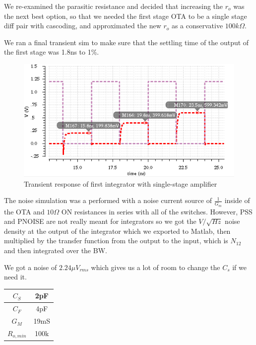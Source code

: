 \documentclass[conference]{IEEEtran}
\begin{document}
We re-examined the parasitic resistance and decided that increasing the $r_o$ was the next best option, so that we needed the first stage OTA to be a single stage diff pair with cascoding, and approximated the new $r_o$ as a conservative $100k\Omega$.

We ran a final transient sim to make sure that the settling time of the output of the first stage was 1.8ns to 1\%. 

\begin{figure}[h]
\centering
\includegraphics[width=\linewidth]{img/stage1-tran}
\caption{Transient response of first integrator with single-stage amplifier}
\label{stage1-tran}
\end{figure}

The noise simulation was a performed with a noise current source of $\frac{1}{G_m}$ inside of the OTA and $10\Omega$ ON resistances in series with all of the switches. However, PSS and PNOISE are not really meant for integrators so we got the $V/\sqrt{Hz}$ noise density at the output of the integrator which we exported to Matlab, then multiplied by the transfer function from the output to the input, which is $N_{12}$ and then integrated over the BW.

We got a noise of $2.24\mu V_{rms}$ which gives us a lot of room to change the $C_s$ if we need it.

\begin{center}
\begin{tabular}{|c|c|} 
\hline
$C_S$ & 2pF \\
\hline
$C_F$ & 4pF \\
\hline
$G_M$ & 19mS \\
\hline
$R_{o,min}$ & 100k \\
\hline
\end{tabular}
\end{center}
\end{document}
